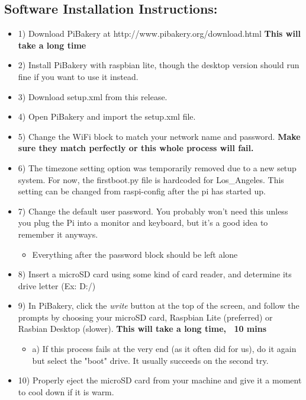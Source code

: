 \documentclass[onecolumn, draftclsnofoot,10pt, compsoc]{IEEEtran}
\begin{document}
	\subsection{\textbf{Software Installation Instructions:}}
	\begin{itemize}
		\item 1) Download PiBakery at http://www.pibakery.org/download.html \textbf{This will take a long time}
		\item 2) Install PiBakery with raspbian lite, though the desktop version should run fine if you want to use it instead.
		\item 3) Download setup.xml from this release.
		\item 4) Open PiBakery and import the setup.xml file.
		\item 5) Change the WiFi block to match your network name and password. \textbf{Make sure they match perfectly or this whole process will fail.}
 		\item 6) The timezone setting option was temporarily removed due to a new setup system. For now, the firstboot.py file is hardcoded for Los\_Angeles. This setting can be changed from raspi-config after the pi has started up.
		\item 7) Change the default user password. You probably won't need this unless you plug the Pi into a monitor and keyboard, but it's a good idea to remember it anyways.
		\begin{itemize}
			\item Everything after the password block should be left alone
		\end{itemize}
		\item 8) Insert a microSD card using some kind of card reader, and determine its drive letter (Ex: D:/)
		\item 9) In PiBakery, click the \textit{write} button at the top of the screen, and follow the prompts by choosing your microSD card, Raspbian Lite (preferred) or Rasbian Desktop (slower). \textbf{This will take a long time, ~10 mins}
		\begin{itemize}
			\item a) If this process fails at the very end (as it often did for us), do it again but select the "boot" drive. It usually succeeds on the second try.
		\end{itemize}
		\item 10) Properly eject the microSD card from your machine and give it a moment to cool down if it is warm.
	\end{itemize}
\end{document}
